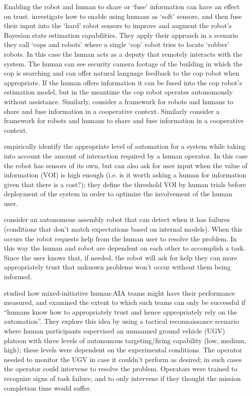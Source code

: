 Enabling the robot and human to share or `fuse' information can have an effect on trust. \citet{Sweet2016-dw} investigate how to enable using humans as `soft' sensors, and then fuse their input into the `hard' robot sensors to improve and augment the robot's Bayesian state estimation capabilities. They apply their approach in a scenario they call `cops and robots' where a single `cop' robot tries to locate `robber' robots. In this case the human acts as a deputy that remotely interacts with the system. The human can see security camera footage of the building in which the cop is searching and can offer natural language feedback to the cop robot when appropriate. If the human offers information it can be fused into the cop robot's estimation model, but in the meantime the cop robot operates autonomously without assistance. Similarly, \citet{Tse2015-tz} consider a framework for robots and humans to share and fuse information in a cooperative context.
Similarly \citet{Tse2015-tz} consider a framework for robots and humans to share and fuse information in a cooperative context. 

\citet{Kaupp2008-yr,Kaupp2005-pk} empirically identify the appropriate level of automation for a system while taking into account the amount of interaction required by a human operator. In this case the robot has sensors of its own, but can also ask for user input when the value of information (VOI) is high enough (i.e. is it worth asking a human for information given that there is a cost?); they define the threshold VOI by human trials before deployment of the system in order to optimize the involvement of the human user.

\citet{Tellex2014-uc} consider an autonomous assembly robot that can detect when it has failures (conditions that don't match expectations based on internal models). When this occurs the robot requests help from the human user to resolve the problem. In this way the human and robot are dependent on each other to accomplish a task. Since the user knows that, if needed, the robot will ask for help they can more appropriately trust that unknown problems won't occur without them being informed.

\citet{Freedy2007-sg} studied how mixed-initiative human-AIA teams might have their performance measured, and examined the extent to which such teams can only be successful if ``humans know how to appropriately trust and hence appropriately rely on the automation''. They explore this idea by using a tactical reconnaissance scenario where human participants supervised an unmanned ground vehicle (UGV)  platoon with three levels of autonomous targeting/firing capability (low, medium, high); these levels were dependent on the experimental conditions. The operator needed to monitor the UGV in case it couldn't perform as desired; in such cases the operator could intervene to resolve the problem. Operators were trained to recognize signs of task failure, and to only intervene if they thought the mission completion time would suffer.

